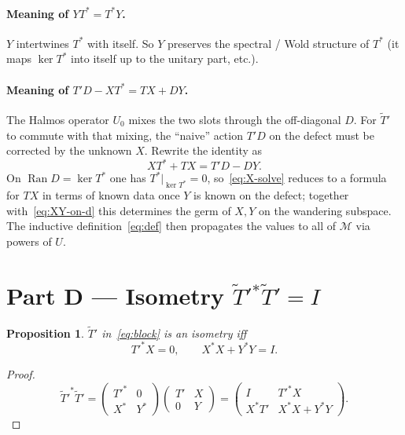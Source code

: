 \documentclass[11pt]{article}
\newtheorem{proposition}{Proposition}
\begin{document}
\paragraph{Meaning of \(YT^*=T^*Y\).}
\(Y\) intertwines \(T^*\) with itself. So \(Y\) preserves the spectral / Wold structure
of \(T^*\) (it maps \(\ker T^*\) into itself up to the unitary part, etc.).

\paragraph{Meaning of \(T'D-XT^*=TX+DY\).}
The Halmos operator \(U_0\) mixes the two slots through the off-diagonal \(D\).
For \(\widetilde{T}'\) to commute with that mixing, the ``naive'' action \(T'D\) on the
defect must be corrected by the unknown \(X\). Rewrite the identity as
\begin{equation}
\label{eq:X-solve}
X T^* + T X
=
T'D-DY.
\end{equation}
On \(\operatorname{Ran}D=\ker T^*\) one has \(T^*|_{\ker T^*}=0\), so~\eqref{eq:X-solve}
reduces to a formula for \(TX\) in terms of known data once \(Y\) is known on the defect;
together with~\eqref{eq:XY-on-d} this determines the germ of \(X,Y\) on the wandering
subspace. The inductive definition~\eqref{eq:def} then propagates the values to all of
\(\mathcal{M}\) via powers of \(U\).

\bigskip
\section*{Part D --- Isometry \(\widetilde{T}'{}^*\widetilde{T}'=I\)}

\begin{proposition}
\(\widetilde{T}'\) in~\eqref{eq:block} is an isometry iff
\begin{equation}
\label{eq:isom}
\boxed{
{T'}^*X=0,
\qquad
X^*X+Y^*Y=I.
}
\end{equation}
\end{proposition}

\begin{proof}
\[
{\widetilde{T}'}^*\widetilde{T}'
=
\begin{pmatrix}{T'}^*&0\\ X^*&Y^*\end{pmatrix}
\begin{pmatrix}T'&X\\ 0&Y\end{pmatrix}
=
\begin{pmatrix}
I & {T'}^*X \\
X^*T' & X^*X+Y^*Y
\end{pmatrix}.
\]
\end{proof}
\end{document}
